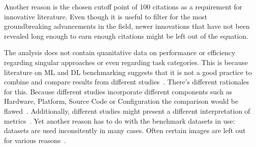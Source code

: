 Another reason is the chosen cutoff point of 100 citations as a requirement for innovative literature.
Even though it is useful to filter for the most groundbreaking advancements in the field,
newer innovations that have not been revealed long enough to earn enough citations might be left
out of the equation.

The analysis does not contain quanitative data on performance or efficiency regarding
singular approaches or even regarding task categories.
This is because literature on \ac{ML} and \ac{DL} benchmarking suggests that it is not a good
practice to combine and compare results from different
studies~\citep{baek_what_2019,arpteg_software_2018,long_scene_2021}.
There's different rationales for this.
Because different studies incorporate different components such as Hardware, Platform, Source Code
or Configuration the comparison would be flawed~\citep{arpteg_software_2018,baek_what_2019}.
Additionally, different studies might present a different interpretation of
metrics~\citep{long_scene_2021}.
Yet another reason has to do with the benchmark datasets in use: datasets are used inconsitently in
many cases.
Often certain images are left out for various reasons~\citep{baek_what_2019}.
